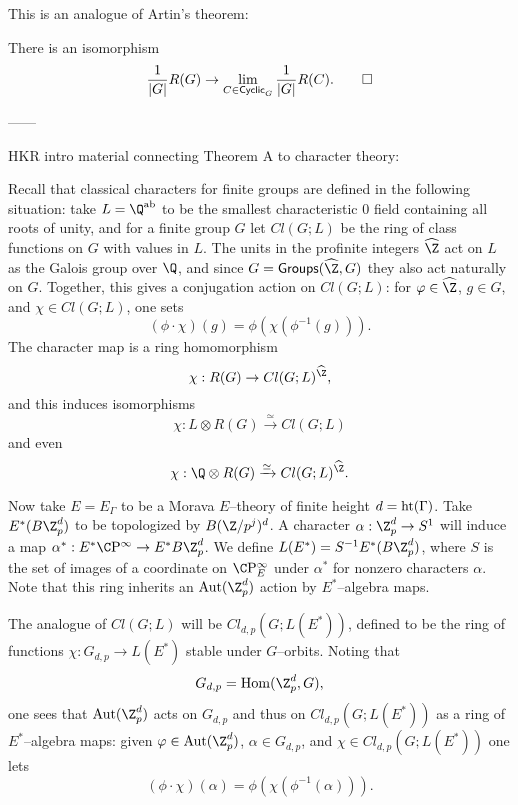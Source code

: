 This is an analogue of Artin's theorem:
\begin{theorem}
There is an isomorphism \[\frac{1}{|G|} R(G) \to \lim_{C \in \mathsf{Cyclic}_G} \frac{1}{|G|} R(C). \qed\]
\end{theorem}


------

HKR intro material connecting Theorem A to character theory:

Recall that classical characters for finite groups are defined in the following situation: take $L = \Q^{\mathrm{ab}}$ to be the smallest characteristic $0$ field containing all roots of unity, and for a finite group $G$ let $Cl(G; L)$ be the ring of class functions on $G$ with values in $L$.  The units in the profinite integers $\widehat{\Z}$ act on $L$ as the Galois group over $\Q$, and since $G = \CatOf{Groups}(\widehat{\Z}, G)$ they also act naturally on $G$.  Together, this gives a conjugation action on $Cl(G; L)$: for $\phi \in \widehat{\Z}$, $g \in G$, and $\chi \in Cl(G; L)$, one sets \[(\phi \cdot \chi)(g) = \phi(\chi(\phi^{-1}(g))).\]  The character map is a ring homomorphism \[\chi: R(G) \to Cl(G; L)^{\widehat{\Z}},\] and this induces isomorphisms \[\chi: L \otimes R(G) \xrightarrow{\simeq} Cl(G; L)\] and even \[\chi: \Q \otimes R(G) \xrightarrow{\simeq} Cl(G; L)^{\widehat{\Z}}.\]

Now take $E = E_\Gamma$ to be a Morava $E$--theory of finite height $d = \operatorname{ht}(\Gamma)$.  Take $E^*(B\Z_p^d)$ to be topologized by $B(\Z/p^j)^d$.  A character $\alpha: \Z_p^d \to S^1$ will induce a map $\alpha^*: E^* \CP^\infty \to E^* B\Z_p^d$.  We define $L(E^*) = S^{-1} E^*(B\Z_p^d)$, where $S$ is the set of images of a coordinate on $\CP^\infty_E$ under $\alpha^*$ for nonzero characters $\alpha$.  Note that this ring inherits an $\operatorname{Aut}(\Z_p^d)$ action by $E^*$--algebra maps.

The analogue of $Cl(G; L)$ will be $Cl_{d,p}(G; L(E^*))$, defined to be the ring of functions $\chi: G_{d, p} \to L(E^*)$ stable under $G$--orbits.  Noting that \[G_{d,p} = \operatorname{Hom}(\Z_p^d, G),\] one sees that $\operatorname{Aut}(\Z_p^d)$ acts on $G_{d,p}$ and thus on $Cl_{d,p}(G; L(E^*))$ as a ring of $E^*$--algebra maps: given $\phi \in \operatorname{Aut}(\Z_p^d)$, $\alpha \in G_{d,p}$, and $\chi \in Cl_{d,p}(G; L(E^*))$ one lets \[(\phi \cdot \chi)(\alpha) = \phi(\chi(\phi^{-1}(\alpha))).\]

